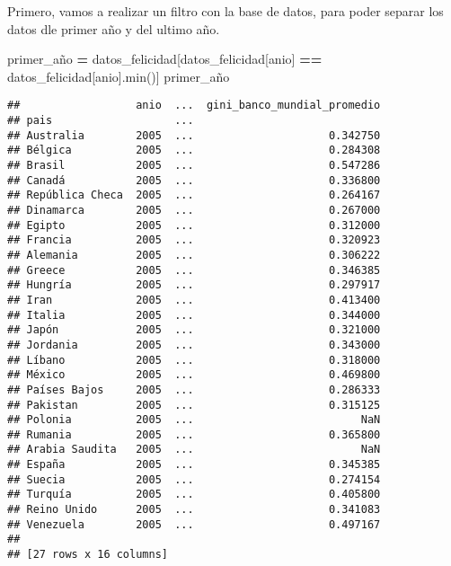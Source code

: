 \documentclass[
]{article}
\newenvironment{Shaded}{\begin{snugshade}}{\end{snugshade}}
\newcommand{\BuiltInTok}[1]{#1}
\newcommand{\NormalTok}[1]{#1}
\newcommand{\OperatorTok}[1]{\textcolor[rgb]{0.81,0.36,0.00}{\textbf{#1}}}
\newcommand{\StringTok}[1]{\textcolor[rgb]{0.31,0.60,0.02}{#1}}
\begin{document}
Primero, vamos a realizar un filtro con la base de datos, para poder
separar los datos dle primer año y del ultimo año.

\begin{Shaded}
\begin{Highlighting}[]
\NormalTok{primer\_año }\OperatorTok{=}\NormalTok{ datos\_felicidad[datos\_felicidad[}\StringTok{\textquotesingle{}anio\textquotesingle{}}\NormalTok{] }\OperatorTok{==}\NormalTok{ datos\_felicidad[}\StringTok{\textquotesingle{}anio\textquotesingle{}}\NormalTok{].}\BuiltInTok{min}\NormalTok{()]}
\NormalTok{primer\_año}
\end{Highlighting}
\end{Shaded}

\begin{verbatim}
##                  anio  ...  gini_banco_mundial_promedio
## pais                   ...                             
## Australia        2005  ...                     0.342750
## Bélgica          2005  ...                     0.284308
## Brasil           2005  ...                     0.547286
## Canadá           2005  ...                     0.336800
## República Checa  2005  ...                     0.264167
## Dinamarca        2005  ...                     0.267000
## Egipto           2005  ...                     0.312000
## Francia          2005  ...                     0.320923
## Alemania         2005  ...                     0.306222
## Greece           2005  ...                     0.346385
## Hungría          2005  ...                     0.297917
## Iran             2005  ...                     0.413400
## Italia           2005  ...                     0.344000
## Japón            2005  ...                     0.321000
## Jordania         2005  ...                     0.343000
## Líbano           2005  ...                     0.318000
## México           2005  ...                     0.469800
## Países Bajos     2005  ...                     0.286333
## Pakistan         2005  ...                     0.315125
## Polonia          2005  ...                          NaN
## Rumania          2005  ...                     0.365800
## Arabia Saudita   2005  ...                          NaN
## España           2005  ...                     0.345385
## Suecia           2005  ...                     0.274154
## Turquía          2005  ...                     0.405800
## Reino Unido      2005  ...                     0.341083
## Venezuela        2005  ...                     0.497167
## 
## [27 rows x 16 columns]
\end{verbatim}
\end{document}
